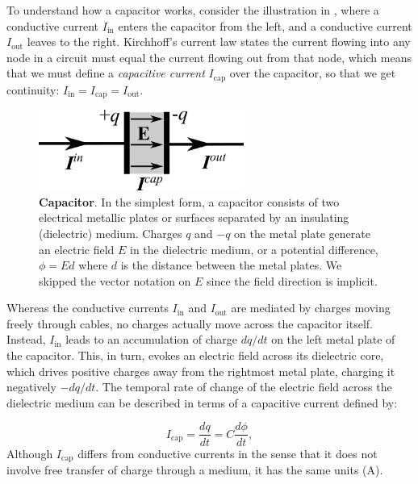 To understand how a capacitor works, consider the illustration in , where a conductive current $I_\text{in}$ enters the capacitor from the left, and a conductive current $I_\text{out}$ leaves to the right. Kirchhoff's current law states the current flowing into any node in a circuit must equal the current flowing out from that node, which means that we must define
a \textit{capacitive current} $I_\text{cap}$ over the capacitor, so that we get continuity: $I_\text{in} = I_\text{cap} = I_\text{out}$.

\begin{figure}[!ht]
\begin{center}
\includegraphics[width=0.6\textwidth]{Figures/Basics/Capacitor.png}
\end{center}
\caption{{\bf Capacitor}.  In the simplest form, a capacitor consists of two electrical metallic plates or surfaces separated by an insulating (dielectric) medium. Charges $q$ and $-q$ on the metal plate generate an electric field $E$ in the dielectric medium, or a potential difference, $\phi = Ed$ where $d$ is the distance between the metal plates. We skipped the vector notation on $E$ since the field direction is implicit.
}
\label{fig:Basics:Capacitor}
\end{figure}

Whereas the conductive currents $I_\text{in}$ and $I_\text{out}$ are mediated by charges moving freely through cables, no charges actually move across the capacitor itself. Instead, $I_\text{in}$ leads to an accumulation of charge $dq/dt$ on the left metal plate of the capacitor. This, in turn, evokes an electric field across its dielectric core, which drives positive charges away from the rightmost metal plate, charging it negatively $-dq/dt$. The temporal rate of change of the electric field across the dielectric medium can be described in terms of a capacitive current defined by:

\begin{equation}
I_\text{cap} = \frac{dq}{dt} = C\frac{d\phi}{dt},
\label{eq:Basics:Icap}
\end{equation}
Although $I_\text{cap}$ differs from conductive currents in the sense that it does not involve free transfer of charge through a medium, it has the same units (A).

